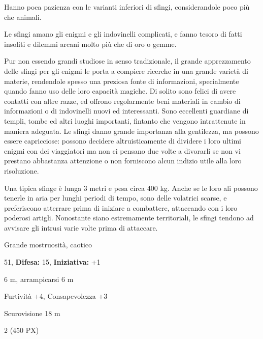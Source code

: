 \begin{multicols}{2}
{Hanno poca pazienza con le varianti inferiori di sfingi, considerandole poco più che animali.

Le sfingi amano gli enigmi e gli indovinelli complicati, e fanno tesoro di fatti insoliti e dilemmi arcani molto più che di oro o gemme.

Pur non essendo grandi studiose in senso tradizionale, il grande apprezzamento delle sfingi per gli enigmi le porta a compiere ricerche in una grande varietà di materie, rendendole spesso una preziosa fonte di informazioni, specialmente quando fanno uso delle loro capacità magiche. Di solito sono felici di avere contatti con altre razze, ed offrono regolarmente beni materiali in cambio di informazioni o di indovinelli nuovi ed interessanti. Sono eccellenti guardiane di templi, tombe ed altri luoghi importanti, fintanto che vengono intrattenute in maniera adeguata. Le sfingi danno grande importanza alla gentilezza, ma possono essere capricciose: possono decidere altruisticamente di dividere i loro ultimi enigmi con dei viaggiatori ma non ci pensano due volte a divorarli se non vi prestano abbastanza attenzione o non forniscono alcun indizio utile alla loro risoluzione.

Una tipica sfinge è lunga 3 metri e pesa circa 400 kg. Anche se le loro ali possono tenerle in aria per lunghi periodi di tempo, sono delle volatrici scarse, e preferiscono atterrare prima di iniziare a combattere, attaccando con i loro poderosi artigli. Nonostante siano estremamente territoriali, le sfingi tendono ad avvisare gli intrusi varie volte prima di attaccare.

\noindent
\begin{description}[noitemsep, topsep=0pt, parsep=0pt, partopsep=0pt, leftmargin=0cm, labelwidth=2.2cm]
	\item[\textbf{Taglia/Tipo:}] Grande mostruosità, caotico
	\item[\textbf{Caratt.:}] 
	\item[\textbf{Punti Ferita:}] 51,  \textbf{Difesa:} 15,  \textbf{Iniziativa:} +1
	\item[\textbf{Movimento:}] 6 m, arrampicarsi 6 m
	\item[\textbf{Tiri Salvez.:}] 
	\item[\textbf{Comp.:}] Furtività +4, Consapevolezza +3
	\item[\textbf{Sensi:}] Scurovisione 18 m
	\item[\textbf{Sfida:}] 2 (450 PX)\smallskip
\end{description}

}
\end{multicols}
